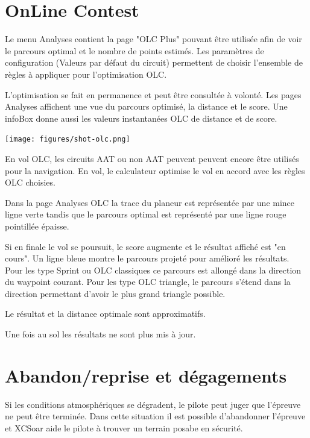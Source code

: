 \section{OnLine Contest}

Le menu Analyses contient la page "OLC Plus" pouvant être utilisée afin de voir le parcours optimal et le nombre de points estimés. Les paramètres de configuration  (Valeurs par défaut du circuit) permettent de choisir l'ensemble de règles à appliquer pour l'optimisation OLC.

L'optimisation se fait en permanence et peut être consultée à volonté. Les pages Analyses affichent une vue du parcours optimisé, la distance et le score. Une infoBox donne aussi les valeurs instantanées OLC de distance et de score.

\begin{center}
\texttt{[image: figures/shot-olc.png]}
\end{center}

En vol OLC, les circuits AAT ou non AAT peuvent peuvent encore être utilisés pour la navigation. En vol, le calculateur optimise le vol en accord avec les règles OLC choisies.

Dans la page Analyses OLC la trace du planeur est représentée par une mince ligne verte tandis que le parcours optimal est représenté par une ligne rouge pointillée épaisse.

Si en finale le vol se poursuit, le score augmente et le résultat affiché est "en cours". Un ligne bleue montre le parcours projeté pour amélioré les résultats. Pour les type Sprint ou OLC classiques ce parcours est allongé dans la direction du waypoint courant. Pour les type OLC triangle, le parcours s'étend dans la direction permettant d'avoir le plus grand triangle possible.  

Le résultat et la distance optimale sont approximatifs.

Une fois au sol les résultats ne sont plus mis à jour.


\section{Abandon/reprise et dégagements}

Si les conditions atmosphériques se dégradent, le pilote peut juger que l'épreuve ne peut être terminée. Dans cette situation il est possible d'abandonner l'épreuve et XCSoar aide le pilote à trouver un terrain posabe en sécurité.

